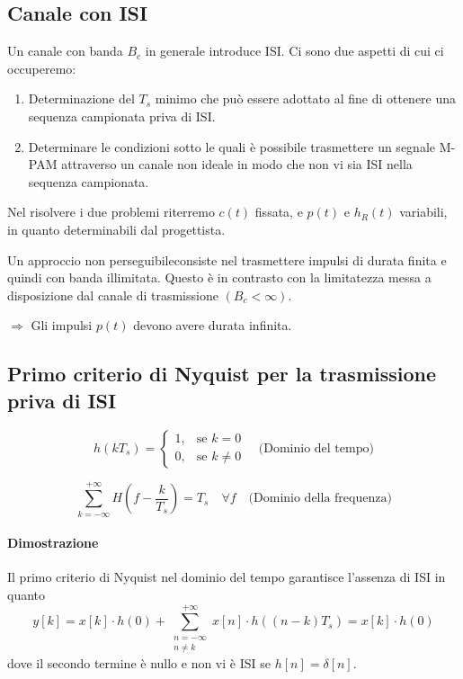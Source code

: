 \subsection*{Canale con ISI}

Un canale con banda \( B_c \) in generale introduce ISI. Ci sono due aspetti di cui ci occuperemo:

\begin{enumerate}
    \item Determinazione del \( T_s \) minimo che può essere adottato al fine di ottenere una sequenza campionata priva di ISI.
    \item Determinare le condizioni sotto le quali è possibile trasmettere un segnale M-PAM attraverso un canale non ideale in modo che non vi sia ISI nella sequenza campionata.
\end{enumerate}

Nel risolvere i due problemi riterremo \( c(t) \) fissata, e \( p(t) \) e \( h_R(t) \) variabili, in quanto determinabili dal progettista.

Un approccio non perseguibileconsiste nel trasmettere impulsi di durata finita e quindi con banda illimitata. Questo è in contrasto con la limitatezza messa a disposizione dal canale di trasmissione \( (B_c < \infty) \).

\(\Rightarrow\) Gli impulsi \( p(t) \) devono avere durata infinita.

\subsection*{Primo criterio di Nyquist per la trasmissione priva di ISI}

\[ h(kT_s) =
    \begin{cases}
        1, & \text{se } k=0      \\
        0, & \text{se } k \neq 0
    \end{cases}
    \quad \text{(Dominio del tempo)}
\]

\[ \sum_{k=-\infty}^{+\infty} H\left(f-\frac{k}{T_s}\right) = T_s \quad \forall f \quad \text{(Dominio della frequenza)} \]




\paragraph*{Dimostrazione}
Il primo criterio di Nyquist nel dominio del tempo garantisce l'assenza di ISI in quanto
\[ y[k] = x[k] \cdot h(0) + \sum_{\substack{n=-\infty \\ n \neq k}}^{+\infty} x[n] \cdot h((n-k)T_s) = x[k] \cdot h(0) \]
dove il secondo termine è nullo e non vi è ISI se \( h[n] = \delta[n] \).

